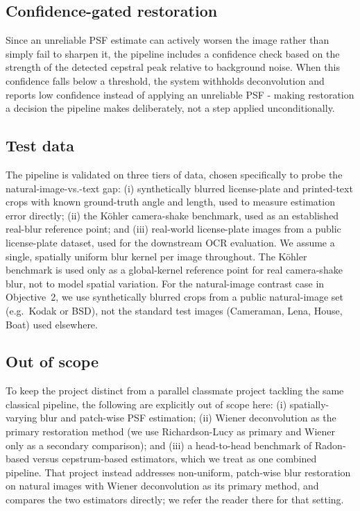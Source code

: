 \documentclass[11pt,a4paper]{article}
\begin{document}
\subsection{Confidence-gated restoration}
Since an unreliable PSF estimate can actively worsen the image rather than simply fail to
sharpen it, the pipeline includes a confidence check based on the strength of the detected
cepstral peak relative to background noise. When this confidence falls below a threshold,
the system withholds deconvolution and reports low confidence instead of applying an
unreliable PSF - making restoration a decision the pipeline makes deliberately, not a step
applied unconditionally.

\subsection{Test data}
The pipeline is validated on three tiers of data, chosen specifically to probe the
natural-image-vs.-text gap: (i) synthetically blurred license-plate and printed-text crops
with known ground-truth angle and length, used to measure estimation error directly;
(ii) the Köhler camera-shake benchmark, used as an established real-blur reference point;
and (iii) real-world license-plate images from a public license-plate dataset, used for the
downstream OCR evaluation. We assume a single, spatially uniform blur kernel per image
throughout. The Köhler benchmark is used only as a global-kernel reference point for real
camera-shake blur, not to model spatial variation. For the natural-image contrast case in
Objective~2, we use synthetically blurred crops from a public natural-image set (e.g.\
Kodak or BSD), not the standard test images (Cameraman, Lena, House, Boat) used
elsewhere.

\subsection{Out of scope}
To keep the project distinct from a parallel classmate project tackling the same classical
pipeline, the following are explicitly out of scope here: (i) spatially-varying blur and
patch-wise PSF estimation; (ii) Wiener deconvolution as the primary restoration method
(we use Richardson-Lucy as primary and Wiener only as a secondary comparison); and
(iii) a head-to-head benchmark of Radon-based versus cepstrum-based estimators, which
we treat as one combined pipeline. That project instead addresses non-uniform,
patch-wise blur restoration on natural images with Wiener deconvolution as its primary
method, and compares the two estimators directly; we refer the reader there for that
setting.
\end{document}
